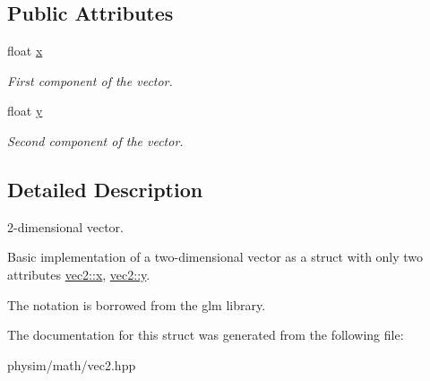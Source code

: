 \subsection*{Public Attributes}
\begin{DoxyCompactItemize}
\item 
\mbox{\label{structphysim_1_1math_1_1vec2_a6a8f77a1b21b1ec2564c92468df19a89}} 
float \hyperlink{structphysim_1_1math_1_1vec2_a6a8f77a1b21b1ec2564c92468df19a89}{x}
\begin{DoxyCompactList}\small\item\em First component of the vector. \end{DoxyCompactList}\item 
\mbox{\label{structphysim_1_1math_1_1vec2_aeed40ea44616cf9e3605e3e94b00d4d9}} 
float \hyperlink{structphysim_1_1math_1_1vec2_aeed40ea44616cf9e3605e3e94b00d4d9}{y}
\begin{DoxyCompactList}\small\item\em Second component of the vector. \end{DoxyCompactList}\end{DoxyCompactItemize}


\subsection{Detailed Description}
2-\/dimensional vector. 

Basic implementation of a two-\/dimensional vector as a struct with only two attributes \hyperlink{structphysim_1_1math_1_1vec2_a6a8f77a1b21b1ec2564c92468df19a89}{vec2\+::x}, \hyperlink{structphysim_1_1math_1_1vec2_aeed40ea44616cf9e3605e3e94b00d4d9}{vec2\+::y}.

The notation is borrowed from the \textquotesingle{}glm\textquotesingle{} library. 

The documentation for this struct was generated from the following file\+:\begin{DoxyCompactItemize}
\item 
physim/math/vec2.\+hpp\end{DoxyCompactItemize}
